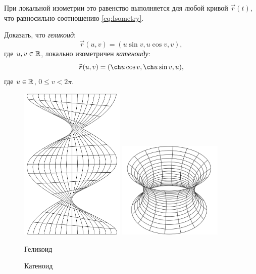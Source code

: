 При локальной изометрии это равенство выполняется для любой кривой $\vec{r}(t)$, что равносильно соотношению \eqref{eq:Isometry}.

\begin{problem}
	Доказать, что \textit{геликоид}:
	\[
		\vec{r}(u, v) = (u\sin v, u\cos v, v),
	\]
	где $u, v \in \mathbb{R}$, локально изометричен \textit{катеноиду}:
	\[
		\widetilde{\vec{r}}(u, v) = (\ch u\cos v, \ch u\sin v, u),
	\]
	где $u \in \mathbb{R}$, $0 \leqslant v < 2\pi$.
\end{problem}

\begin{figure}[H]
	\centering
	\begin{minipage}{.4\textwidth}
		\centering
		\includegraphics[width=5cm]{./img/Helicoid.pdf}
	\end{minipage}
	\begin{minipage}{.4\textwidth}
		\centering
		\includegraphics[width=5cm]{./img/Catenoid.pdf}
	\end{minipage}
	\vspace{.3cm}

	\begin{minipage}{.4\textwidth}
		\centering
		Геликоид
	\end{minipage}
	\begin{minipage}{.4\textwidth}
		\centering
		Катеноид
	\end{minipage}
	
	\caption[format=empty]{}
	\label{fig:HelicoidCatenoid}
\end{figure}

